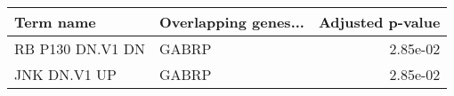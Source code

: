 \begin{tabular}{llr}
\toprule
       Term name & Overlapping genes... &  Adjusted p-value \\
\midrule
RB P130 DN.V1 DN &                GABRP &          2.85e-02 \\
    JNK DN.V1 UP &                GABRP &          2.85e-02 \\
\bottomrule
\end{tabular}
